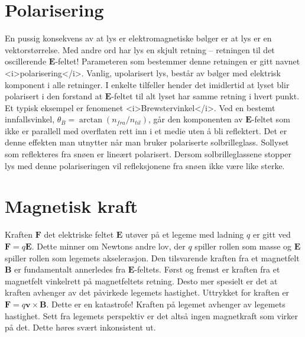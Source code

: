 \documentclass[twoside,utf8]{article}
\begin{document}
\section{Polarisering}
En pussig konsekvens av at lys er elektromagnetiske bølger er at lys er en vektorstørrelse. Med andre ord har lys en skjult retning -- retningen til det oscillerende $\mathbf{E}$-feltet! Parameteren som bestemmer denne retningen er gitt navnet <i>polarisering</i>. Vanlig, upolarisert lys, består av bølger med elektrisk komponent i alle retninger. I enkelte tilfeller hender det imidlertid at lyset blir polarisert i den forstand at $\mathbf{E}$-feltet til alt lyset har samme retning i hvert punkt. Et typisk eksempel er fenomenet <i>Brewstervinkel</i>. Ved en bestemt innfallsvinkel, $\theta_B=\arctan (n_{fra}/n_{til})$, går den komponenten av $\mathbf{E}$-feltet som ikke er parallell med overflaten rett inn i et medie uten å bli reflektert. Det er denne effekten man utnytter når man bruker polariserte solbrilleglass. Sollyset som reflekteres fra snøen er lineært polarisert. Dersom solbrilleglassene stopper lys med denne polariseringen vil refleksjonene fra snøen ikke være like sterke.




\section{Magnetisk kraft}
Kraften $\mathbf{F}$ det elektriske feltet $\mathbf{E}$ utøver på et legeme med ladning $q$ er gitt ved $\mathbf{F}=q \mathbf{E}$. Dette minner om Newtons andre lov, der $q$ spiller rollen som masse og $\mathbf{E}$ spiller rollen som legemets akselerasjon.
Den tilsvarende kraften fra et magnetfelt $\mathbf{B}$ er fundamentalt annerledes fra $\mathbf{E}$-feltets. Først og fremst er kraften fra et magnetfelt vinkelrett på magnetfeltets retning. Desto mer spesielt er det at kraften avhenger av det påvirkede legemets hastighet. Uttrykket for kraften er $\mathbf{F}=q\mathbf{v}\times \mathbf{B}$.
Dette er en katastrofe! Kraften på legemet avhenger av legemets hastighet. Sett fra legemets perspektiv er det altså ingen magnetkraft som virker på det. Dette høres svært inkonsistent ut.
\end{document}
